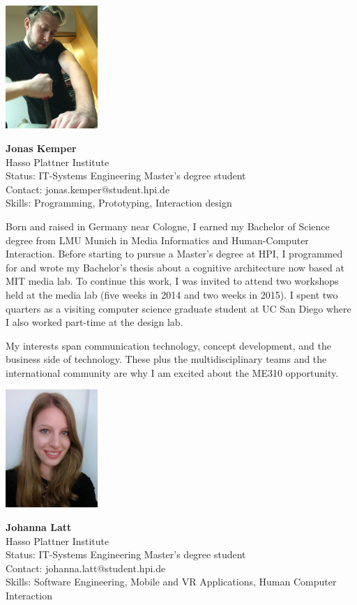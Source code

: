 
\vspace{2em}
\noindent \includegraphics[width=35mm]{Figures/People/Jonas}
\hspace{0.5em}\parbox[b]{0.6\textwidth}{\textbf{Jonas Kemper}\\
Hasso Plattner Institute\\
Status: IT-Systems Engineering Master's degree student\\
Contact: jonas.kemper@student.hpi.de\\
Skills: Programming, Prototyping, Interaction design\\}

Born and raised in Germany near Cologne, I earned my Bachelor of Science degree from LMU Munich in Media Informatics and Human-Computer Interaction. Before starting to pursue a Master's degree at HPI, I programmed for and wrote my Bachelor's thesis about a cognitive architecture now based at MIT media lab. To continue this work, I was invited to attend two workshops held at the media lab (five weeks in 2014 and two weeks in 2015). I spent two quarters as a visiting computer science graduate student at UC San Diego where I also worked part-time at the design lab.

My interests span communication technology, concept development, and the business side of technology. These plus the multidisciplinary teams and the international community are why I am excited about the ME310 opportunity.

\vspace{2em}
\noindent \includegraphics[width=35mm]{Figures/People/Johanna}
\hspace{0.5em}\parbox[b]{0.6\textwidth}{\textbf{Johanna Latt}\\
Hasso Plattner Institute\\
Status: IT-Systems Engineering Master's degree student\\
Contact: johanna.latt@student.hpi.de\\
Skills: Software Engineering, Mobile and VR Applications, Human Computer Interaction\\
}

